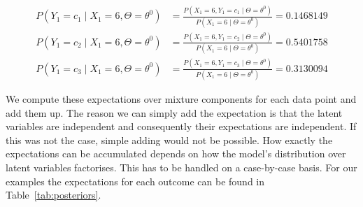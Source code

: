 \documentclass[a4paper,11pt,leqno]{report}\usepackage[]{graphicx}\usepackage[]{color}
\begin{document}
\begin{align}\label{eq:posterior}
P(Y_{1} = c_{1} \mid X_{1}=6,\Theta= \theta^{0}) &= \frac{P(X_{1}=6,Y_{1} = c_{1} \mid \Theta= \theta^{0})}{P(X_1 = 6 \mid \Theta= \theta^{0})} = 0.1468149 \\
P(Y_{1} = c_{2} \mid X_{1}=6,\Theta= \theta^{0}) &= \frac{P(X_{1}=6,Y_{1} = c_{2} \mid \Theta= \theta^{0})}{P(X_1 = 6 \mid \Theta= \theta^{0})} = 0.5401758 \nonumber \\
P(Y_{1} = c_{3} \mid X_{1}=6,\Theta= \theta^{0}) &= \frac{P(X_{1}=6,Y_{1} = c_{3} \mid \Theta= \theta^{0})}{P(X_1 = 6 \mid \Theta= \theta^{0})} = 0.3130094 \nonumber
\end{align}

We compute these expectations over mixture components for each data point and add them up. The reason we can simply add the expectation is that
the latent variables are independent and consequently their expectations are independent. If this was not the case, simple adding would not
be possible. How exactly the expectations can be accumulated depends on how the model's distribution over latent variables factorises. This has to
be handled on a case-by-case basis. For our examples the expectations for each outcome can be found in Table~\ref{tab:posteriors}.
\end{document}
